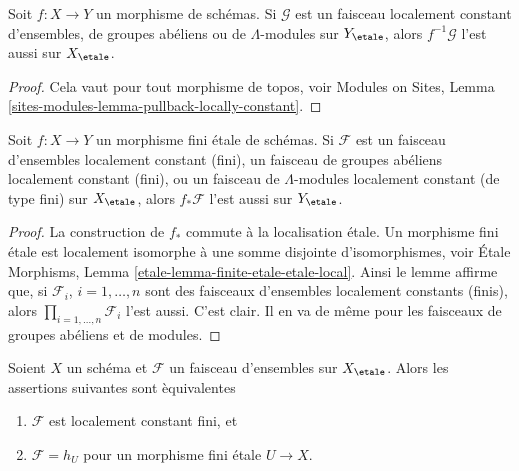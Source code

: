 \begin{lemma}
\label{lemma-pullback-locally-constant}
Soit $f : X \to Y$ un morphisme de sch\'emas. Si $\mathcal{G}$ est un
faisceau localement constant d'ensembles, de groupes ab\'eliens ou de $\Lambda$-modules
sur $Y_\etale$, alors $f^{-1}\mathcal{G}$ l'est aussi
sur $X_\etale$.
\end{lemma}

\begin{proof}
Cela vaut pour tout morphisme de topos, voir
Modules on Sites, Lemma \ref{sites-modules-lemma-pullback-locally-constant}.
\end{proof}

\begin{lemma}
\label{lemma-pushforward-locally-constant}
Soit $f : X \to Y$ un morphisme fini \'etale de sch\'emas.
Si $\mathcal{F}$ est un faisceau d'ensembles localement constant (fini),
un faisceau de groupes ab\'eliens localement constant (fini), ou
un faisceau de $\Lambda$-modules localement constant (de type fini)
sur $X_\etale$, alors $f_*\mathcal{F}$ l'est aussi
sur $Y_\etale$.
\end{lemma}

\begin{proof}
La construction de $f_*$ commute \`a la localisation \'etale.
Un morphisme fini \'etale est localement isomorphe \`a une somme disjointe
d'isomorphismes, voir
\'Etale Morphisms, Lemma \ref{etale-lemma-finite-etale-etale-local}.
Ainsi le lemme affirme que, si $\mathcal{F}_i$, $i = 1, \ldots, n$
sont des faisceaux d'ensembles localement constants (finis), alors
$\prod_{i = 1, \ldots, n} \mathcal{F}_i$ l'est aussi.
C'est clair. Il en va de m\^eme pour les faisceaux de groupes ab\'eliens et de modules.
\end{proof}

\begin{lemma}
\label{lemma-characterize-finite-locally-constant}
Soient $X$ un sch\'ema et $\mathcal{F}$ un faisceau d'ensembles sur $X_\etale$.
Alors les assertions suivantes sont \`equivalentes
\begin{enumerate}
\item $\mathcal{F}$ est localement constant fini, et
\item $\mathcal{F} = h_U$ pour un morphisme fini \'etale $U \to X$.
\end{enumerate}
\end{lemma}

